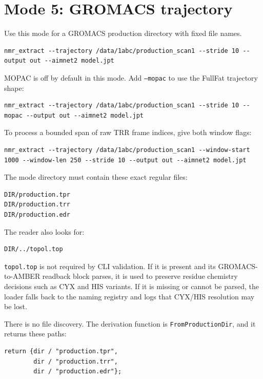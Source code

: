 \documentclass[11pt]{article}
\begin{document}
\section{Mode 5: GROMACS trajectory}

Use this mode for a GROMACS production directory with fixed file names.

\begin{lstlisting}
nmr_extract --trajectory /data/1abc/production_scan1 --stride 10 --output out --aimnet2 model.jpt
\end{lstlisting}

MOPAC is off by default in this mode. Add \texttt{--mopac} to use the FullFat
trajectory shape:

\begin{lstlisting}
nmr_extract --trajectory /data/1abc/production_scan1 --stride 10 --mopac --output out --aimnet2 model.jpt
\end{lstlisting}

To process a bounded span of raw TRR frame indices, give both window flags:

\begin{lstlisting}
nmr_extract --trajectory /data/1abc/production_scan1 --window-start 1000 --window-len 250 --stride 10 --output out --aimnet2 model.jpt
\end{lstlisting}

The mode directory must contain these exact regular files:

\begin{lstlisting}
DIR/production.tpr
DIR/production.trr
DIR/production.edr
\end{lstlisting}

The reader also looks for:

\begin{lstlisting}
DIR/../topol.top
\end{lstlisting}

\texttt{topol.top} is not required by CLI validation. If it is present and its
GROMACS-to-AMBER readback block parses, it is used to preserve residue
chemistry decisions such as CYX and HIS variants. If it is missing or cannot
be parsed, the loader falls back to the naming registry and logs that CYX/HIS
resolution may be lost.

There is no file discovery. The derivation function is
\texttt{FromProductionDir}, and it returns these paths:

\begin{lstlisting}
return {dir / "production.tpr",
        dir / "production.trr",
        dir / "production.edr"};
\end{lstlisting}
\end{document}
